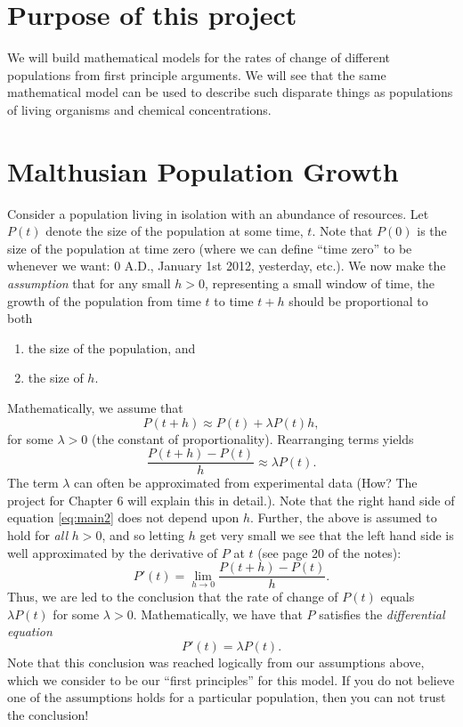 




\section{Purpose of this project}

We will build mathematical models for the rates of change of different
populations from first principle arguments.  We will see that the same
mathematical model can be used to describe such disparate things as
populations of living organisms and chemical concentrations.

\section{Malthusian Population Growth}

Consider a population living in isolation with an abundance of
resources.  Let $P(t)$ denote the size of the population at some time,
$t$.  Note that $P(0)$ is the size of the population at time zero
(where we can define ``time zero'' to be whenever we want: 0 A.D.,
January 1st 2012, yesterday, etc.).  We now make the
\textit{assumption} that for any small $h>0$, representing a small
window of time, the growth of the population from time $t$ to time
$t+h$ should be proportional to both
\begin{enumerate}
\item the size of the population, and
\item the size of $h$.
\end{enumerate}
Mathematically, we assume that
\begin{equation}\label{main:eq}
  P(t+h) \approx P(t) + \lambda P(t) h,
\end{equation}
for some $\lambda >0$ (the constant of proportionality).  Rearranging
terms yields
\begin{equation}\label{eq:main2}
  \frac{P(t+h)-P(t)}{h} \approx \lambda P(t).
\end{equation}
The term $\lambda$ can often be approximated from experimental data
(How?  The project for Chapter 6 will explain this in detail.).  Note
that the right hand side of equation \eqref{eq:main2} does not depend
upon $h$.  Further, the above is assumed to hold for \textit{all}
$h>0$, and so letting $h$ get very small we see that the left hand
side is well approximated by the derivative of $P$ at $t$ (see page 20
of the notes):
\[
P'(t) = \lim_{h \to 0}\frac{P(t+h)-P(t)}{h}.
\]
Thus, we are led to the conclusion that the rate of change of $P(t)$
equals $\lambda P(t)$ for some $\lambda > 0$.  Mathematically, we have
that $P$ satisfies the {\em differential equation}
\begin{equation*}
  P'(t) = \lambda P(t).
\end{equation*}
Note that this conclusion was reached logically from our assumptions
above, which we consider to be our ``first principles'' for this
model.  If you do not believe one of the assumptions holds for a
particular population, then you can not trust the conclusion!

